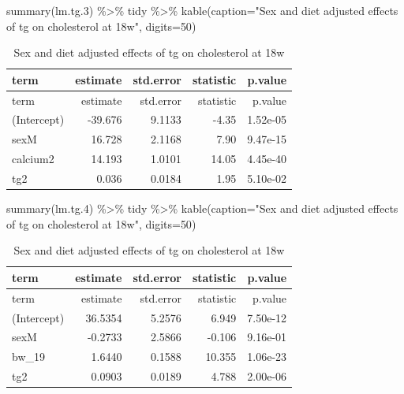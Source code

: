 \documentclass[
]{article}
\newenvironment{Shaded}{\begin{snugshade}}{\end{snugshade}}
\newcommand{\AttributeTok}[1]{\textcolor[rgb]{0.77,0.63,0.00}{#1}}
\newcommand{\DecValTok}[1]{\textcolor[rgb]{0.00,0.00,0.81}{#1}}
\newcommand{\FloatTok}[1]{\textcolor[rgb]{0.00,0.00,0.81}{#1}}
\newcommand{\FunctionTok}[1]{\textcolor[rgb]{0.00,0.00,0.00}{#1}}
\newcommand{\NormalTok}[1]{#1}
\newcommand{\SpecialCharTok}[1]{\textcolor[rgb]{0.00,0.00,0.00}{#1}}
\newcommand{\StringTok}[1]{\textcolor[rgb]{0.31,0.60,0.02}{#1}}
\begin{document}
\begin{Shaded}
\begin{Highlighting}[]
\FunctionTok{summary}\NormalTok{(lm.tg}\FloatTok{.3}\NormalTok{) }\SpecialCharTok{\%\textgreater{}\%}\NormalTok{ tidy }\SpecialCharTok{\%\textgreater{}\%} \FunctionTok{kable}\NormalTok{(}\AttributeTok{caption=}\StringTok{"Sex and diet adjusted effects of tg on cholesterol at 18w"}\NormalTok{, }\AttributeTok{digits=}\DecValTok{50}\NormalTok{)}
\end{Highlighting}
\end{Shaded}

\begin{longtable}[]{@{}lrrrr@{}}
\caption{Sex and diet adjusted effects of tg on cholesterol at
18w}\tabularnewline
\toprule()
term & estimate & std.error & statistic & p.value \\
\midrule()
\endfirsthead
\toprule()
term & estimate & std.error & statistic & p.value \\
\midrule()
\endhead
(Intercept) & -39.676 & 9.1133 & -4.35 & 1.52e-05 \\
sexM & 16.728 & 2.1168 & 7.90 & 9.47e-15 \\
calcium2 & 14.193 & 1.0101 & 14.05 & 4.45e-40 \\
tg2 & 0.036 & 0.0184 & 1.95 & 5.10e-02 \\
\bottomrule()
\end{longtable}

\begin{Shaded}
\begin{Highlighting}[]
\FunctionTok{summary}\NormalTok{(lm.tg}\FloatTok{.4}\NormalTok{) }\SpecialCharTok{\%\textgreater{}\%}\NormalTok{ tidy }\SpecialCharTok{\%\textgreater{}\%} \FunctionTok{kable}\NormalTok{(}\AttributeTok{caption=}\StringTok{"Sex and diet adjusted effects of tg on cholesterol at 18w"}\NormalTok{, }\AttributeTok{digits=}\DecValTok{50}\NormalTok{)}
\end{Highlighting}
\end{Shaded}

\begin{longtable}[]{@{}lrrrr@{}}
\caption{Sex and diet adjusted effects of tg on cholesterol at
18w}\tabularnewline
\toprule()
term & estimate & std.error & statistic & p.value \\
\midrule()
\endfirsthead
\toprule()
term & estimate & std.error & statistic & p.value \\
\midrule()
\endhead
(Intercept) & 36.5354 & 5.2576 & 6.949 & 7.50e-12 \\
sexM & -0.2733 & 2.5866 & -0.106 & 9.16e-01 \\
bw\_19 & 1.6440 & 0.1588 & 10.355 & 1.06e-23 \\
tg2 & 0.0903 & 0.0189 & 4.788 & 2.00e-06 \\
\bottomrule()
\end{longtable}
\end{document}
